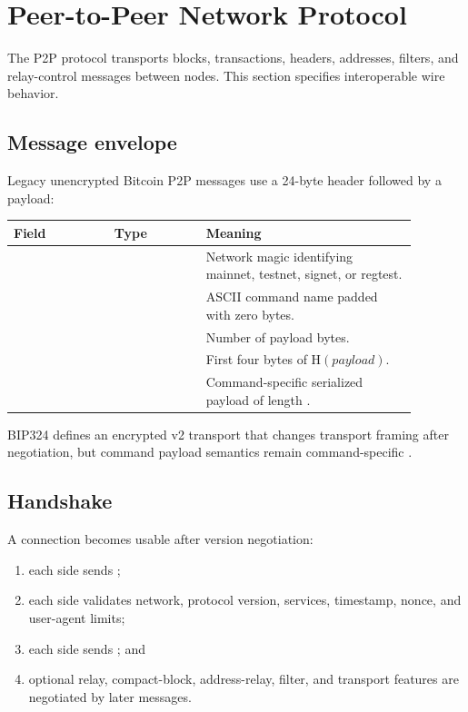\section{Peer-to-Peer Network Protocol}
\label{sec:p2p}

The P2P protocol transports blocks, transactions, headers, addresses, filters,
and relay-control messages between nodes. This section specifies interoperable
wire behavior.

\subsection{Message envelope}

Legacy unencrypted Bitcoin P2P messages use a 24-byte header followed by a
payload:

\begin{longtable}{@{}L{0.22\linewidth}L{0.20\linewidth}L{0.46\linewidth}@{}}
\toprule
Field & Type & Meaning \\
\midrule
{} &  & Network magic identifying mainnet, testnet, signet, or regtest. \\
 &  & ASCII command name padded with zero bytes. \\
 &  & Number of payload bytes. \\
 &  & First four bytes of \(\mathrm{H}(payload)\). \\
 &  & Command-specific serialized payload of length . \\
\bottomrule
\end{longtable}

BIP324 defines an encrypted v2 transport that changes transport framing after
negotiation, but command payload semantics remain command-specific
\cite{bip-0324,bitcoin-core-v31}.

\subsection{Handshake}

A connection becomes usable after version negotiation:

\begin{enumerate}[leftmargin=*]
  \item each side sends ;
  \item each side validates network, protocol version, services, timestamp,
        nonce, and user-agent limits;
  \item each side sends ; and
  \item optional relay, compact-block, address-relay, filter, and transport
        features are negotiated by later messages.
\end{enumerate}

